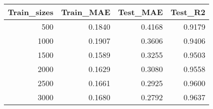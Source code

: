 \begin{tabular}{rrrr}
\toprule
Train_sizes & Train_MAE & Test_MAE & Test_R2 \\
\midrule
500 & 0.1840 & 0.4168 & 0.9179 \\
1000 & 0.1907 & 0.3606 & 0.9406 \\
1500 & 0.1589 & 0.3255 & 0.9503 \\
2000 & 0.1629 & 0.3080 & 0.9558 \\
2500 & 0.1661 & 0.2925 & 0.9600 \\
3000 & 0.1680 & 0.2792 & 0.9637 \\
\bottomrule
\end{tabular}
